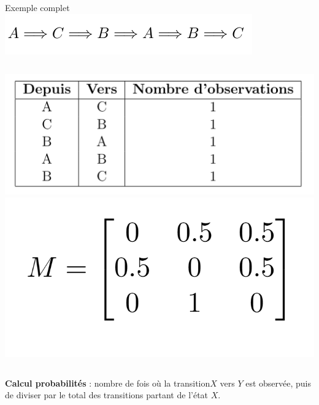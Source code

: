 \begin{frame}{Exemple complet}
\vspace{-0.5cm}
\centering
        \includegraphics[width=0.8\textwidth]{images/transition_ex_markov.png} 
        \vspace{1cm}
    \begin{columns}
    		\includegraphics[width=\textwidth]{images/tableau_ex_markov.png} 
                \includegraphics[width=\textwidth]{images/matrice_markov.png} 
    \end{columns} 
    \vspace{1cm}
    \textbf{Calcul probabilités} :  nombre de fois où la transition\(X\) vers \(Y\) est observée, puis de diviser par le total des transitions partant de l'état \(X\).
\end{frame}
